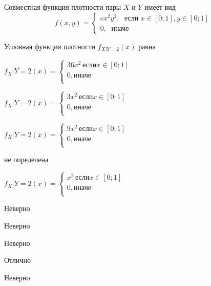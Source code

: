 
\begin{question}
Совместная функция плотности пары \(X\) и \(Y\) имеет вид \[
f(x,y)=\begin{cases}
cx^2y^2, \; \text{ если } x\in[0;1], y\in [0;1] \\
0, \; \text{ иначе}
\end{cases}
\]

\vspace{0.5cm}

Условная функция плотности \(f_{X|Y=2}(x)\) равна
\begin{answerlist}
  \item \(f_X|Y=2(x)=\begin{cases} 36x^2\, \text{если} x\in [0;1] \\ 0, \text{иначе} \\ \end{cases}\)
  \item \(f_X|Y=2(x)=\begin{cases} 3x^2\, \text{если} x\in [0;1] \\ 0, \text{иначе} \\ \end{cases}\)
  \item \(f_X|Y=2(x)=\begin{cases} 9x^2\, \text{если} x\in [0;1] \\ 0, \text{иначе} \\ \end{cases}\)
  \item не определена
  \item \(f_X|Y=2(x)=\begin{cases} x^2\, \text{если} x\in [0;1] \\ 0, \text{иначе} \\ \end{cases}\)
\end{answerlist}
\end{question}

\begin{solution}
\begin{answerlist}
  \item Неверно
  \item Неверно
  \item Неверно
  \item Отлично
  \item Неверно
\end{answerlist}
\end{solution}

